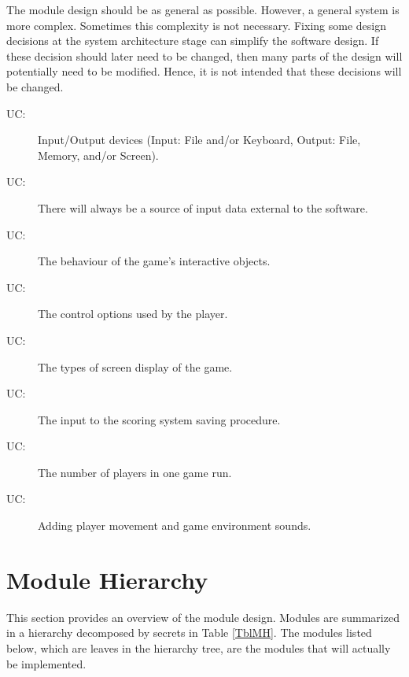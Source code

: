 \documentclass[12pt, titlepage]{article}
\newcounter{ucnum}
\newcommand{\uctheucnum}{UC\theucnum}
\begin{document}
The module design should be as general as possible. However, a general system is
more complex. Sometimes this complexity is not necessary. Fixing some design
decisions at the system architecture stage can simplify the software design. If
these decision should later need to be changed, then many parts of the design
will potentially need to be modified. Hence, it is not intended that these
decisions will be changed.

\begin{description}
\item[ \uctheucnum \label{ucIO}:] Input/Output devices
  (Input: File and/or Keyboard, Output: File, Memory, and/or Screen).
\item[ \uctheucnum \label{ucInput}:] There will always be
  a source of input data external to the software.
\item[ \uctheucnum \label{ucObject}:] The behaviour of the game's interactive objects. 
\item[ \uctheucnum \label{ucOptions}:] The control options used by the player. 
\item[ \uctheucnum \label{ucScreen}:] The types of screen display of the game.
\item[ \uctheucnum \label{ucScore}:] The input to the scoring system saving procedure. 
\item[ \uctheucnum \label{ucPlayer}:] The number of players in one game run. 
\item[ \uctheucnum \label{ucSound}:] Adding player movement and game environment sounds.
\end{description}

\section{Module Hierarchy} \label{SecMH}

This section provides an overview of the module design. Modules are summarized
in a hierarchy decomposed by secrets in Table \ref{TblMH}. The modules listed
below, which are leaves in the hierarchy tree, are the modules that will
actually be implemented.
\end{document}
